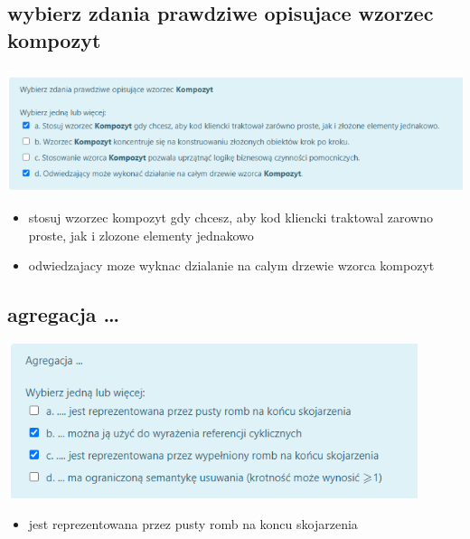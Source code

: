 \documentclass[11pt]{article}
\begin{document}
\subsection{wybierz zdania prawdziwe opisujace wzorzec kompozyt}
\label{sec:org315d9b8}
\begin{center}
\includegraphics[width=.9\linewidth]{./zadanie8.png}
\end{center}
\begin{itemize}
\item stosuj wzorzec kompozyt gdy chcesz, aby kod kliencki traktowal zarowno proste, jak i zlozone elementy jednakowo
\item odwiedzajacy moze wyknac dzialanie na calym drzewie wzorca kompozyt
\end{itemize}
\subsection{agregacja \ldots{}}
\label{sec:org15eb521}
\begin{center}
\includegraphics[width=.9\linewidth]{./zadanie9.png}
\end{center}
\begin{itemize}
\item jest reprezentowana przez pusty romb na koncu skojarzenia
\end{itemize}
\end{document}
